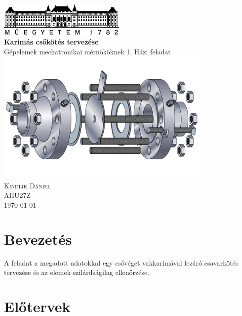 \documentclass[10pt, a4paper]{article}
\begin{document}
	\begin{titlepage}
		\centering
		\includegraphics[width=175pt]{ BMElogo.png } \\
		\vspace*{2cm}
		{\Huge \bfseries Karimás csőkötés tervezése} \\
		\vspace{0.5cm}
		{\Large Gépelemek mechatronikai mérnököknek 1. Házi feladat} \\
		\vspace{0.5cm}
		\includegraphics[width=300pt, angle=-90]{ karima_rajz.png } \\
		\vspace{1cm}
		{\Large \scshape Kindlik Dániel} \\
		\vspace{0.5cm}
		AHU27Z \\
		\vfill
		{\large \today} \\
	\end{titlepage}
	
	\thispagestyle{empty}
	\tableofcontents
	\newpage
	\setcounter{page}{3}
	\section*{Bevezetés}
	A feladat a megadott adatokkal egy csővéget vakkarimával lezáró csavarkötés tervezése és az elemek szilárdságilag
	ellenőrzése.
	\section{Előtervek}
\end{document}
